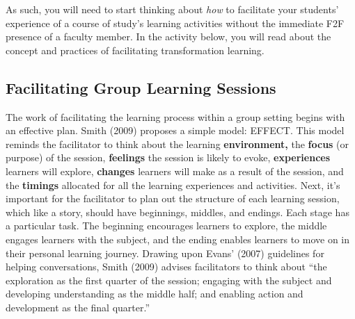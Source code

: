 \documentclass[
]{book}
\begin{document}
As such, you will need to start thinking about \emph{how} to facilitate your students' experience of a course of study's learning activities without the immediate F2F presence of a faculty member. In the activity below, you will read about the concept and practices of facilitating transformation learning.

\hypertarget{facilitating-group-learning-sessions}{%
\subsection*{Facilitating Group Learning Sessions}\label{facilitating-group-learning-sessions}}

The work of facilitating the learning process within a group setting begins with an effective plan. Smith (2009) proposes a simple model: EFFECT. This model reminds the facilitator to think about the learning \textbf{environment,} the \textbf{focus} (or purpose) of the session, \textbf{feelings} the session is likely to evoke, \textbf{experiences} learners will explore, \textbf{changes} learners will make as a result of the session, and the \textbf{timings} allocated for all the learning experiences and activities. Next, it's important for the facilitator to plan out the structure of each learning session, which like a story, should have beginnings, middles, and endings. Each stage has a particular task. The beginning encourages learners to explore, the middle engages learners with the subject, and the ending enables learners to move on in their personal learning journey. Drawing upon Evans' (2007) guidelines for helping conversations, Smith (2009) advises facilitators to think about ``the exploration as the first quarter of the session; engaging with the subject and developing understanding as the middle half; and enabling action and development as the final quarter.''
\end{document}
